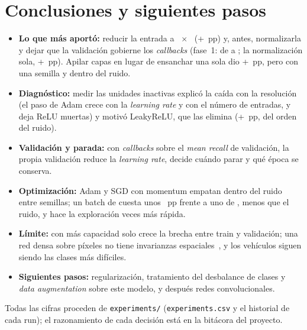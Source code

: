 \section{Conclusiones y siguientes pasos}
\begin{itemize}
  \item \textbf{Lo que más aportó:} reducir la entrada a ~$\times$~
  (+~pp) y, antes, normalizarla y dejar que la validación gobierne los \emph{callbacks} (fase~1:
  de  a ; la normalización sola, +~pp).
  Apilar capas en lugar de ensanchar una sola dio +~pp, pero con una semilla y dentro del ruido.
  \item \textbf{Diagnóstico:} medir las unidades inactivas explicó la caída con la resolución (el paso de Adam crece con
  la \emph{learning rate} y con el número de entradas, y deja ReLU muertas) y motivó LeakyReLU, que las elimina
  (+~pp, del orden del ruido).
  \item \textbf{Validación y parada:} con \emph{callbacks} sobre el \emph{mean recall} de validación, la propia
  validación reduce la \emph{learning rate}, decide cuándo parar y qué época se conserva.
  \item \textbf{Optimización:} Adam y SGD con momentum empatan dentro del ruido entre semillas; un batch de
   cuesta unos ~pp frente a uno de , menos que el ruido, y hace
  la exploración  veces más rápida.
  \item \textbf{Límite:} con más capacidad solo crece la brecha entre train y validación; una red densa sobre píxeles
  no tiene invarianzas espaciales~\cite{goodfellow}, y los vehículos siguen siendo las clases más difíciles.
  \item \textbf{Siguientes pasos:} regularización, tratamiento del desbalance de clases y \emph{data augmentation}
  sobre este modelo, y después redes convolucionales.
\end{itemize}

Todas las cifras proceden de \texttt{experiments/} (\texttt{experiments.csv} y el historial de cada run); el
razonamiento de cada decisión está en la bitácora del proyecto.

